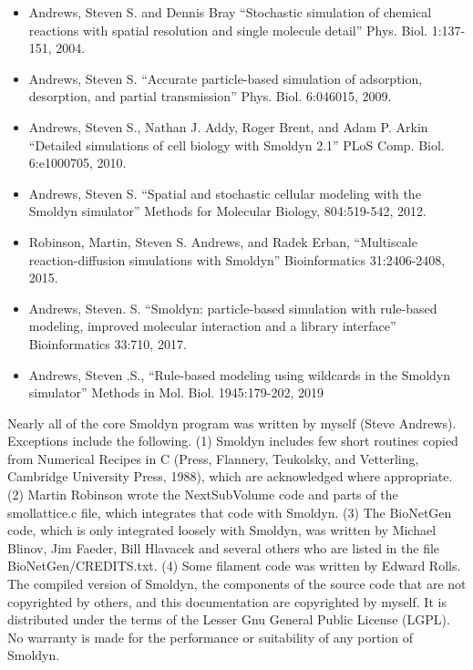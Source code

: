 \documentclass {scrbook}
\begin{document}
\begin{itemize}

\item Andrews, Steven S. and Dennis Bray ``Stochastic simulation of chemical reactions with spatial resolution and single molecule detail'' Phys. Biol. 1:137-151, 2004.

\item Andrews, Steven S. ``Accurate particle-based simulation of adsorption, desorption, and partial transmission'' Phys. Biol. 6:046015, 2009.

\item Andrews, Steven S., Nathan J. Addy, Roger Brent, and Adam P. Arkin ``Detailed simulations of cell biology with Smoldyn 2.1'' PLoS Comp. Biol. 6:e1000705, 2010.

\item Andrews, Steven S. ``Spatial and stochastic cellular modeling with the Smoldyn simulator'' Methods for Molecular Biology, 804:519-542, 2012.

\item Robinson, Martin, Steven S. Andrews, and Radek Erban, ``Multiscale reaction-diffusion simulations with Smoldyn'' Bioinformatics 31:2406-2408, 2015.

\item Andrews, Steven. S. ``Smoldyn: particle-based simulation with rule-based modeling, improved molecular interaction and a library interface'' Bioinformatics 33:710, 2017.

\item Andrews, Steven .S., ``Rule-based modeling using wildcards in the Smoldyn simulator'' Methods in Mol. Biol. 1945:179-202, 2019

\end{itemize}

Nearly all of the core Smoldyn program was written by myself (Steve Andrews). Exceptions include the following. (1) Smoldyn includes few short routines copied from Numerical Recipes in C (Press, Flannery, Teukolsky, and Vetterling, Cambridge University Press, 1988), which are acknowledged where appropriate. (2) Martin Robinson wrote the NextSubVolume code and parts of the smollattice.c file, which integrates that code with Smoldyn. (3) The BioNetGen code, which is only integrated loosely with Smoldyn, was written by Michael Blinov, Jim Faeder, Bill Hlavacek and several others who are listed in the file BioNetGen/CREDITS.txt. (4) Some filament code was written by Edward Rolls. The compiled version of Smoldyn, the components of the source code that are not copyrighted by others, and this documentation are copyrighted by myself. It is distributed under the terms of the Lesser Gnu General Public License (LGPL). No warranty is made for the performance or suitability of any portion of Smoldyn.
\end{document}
